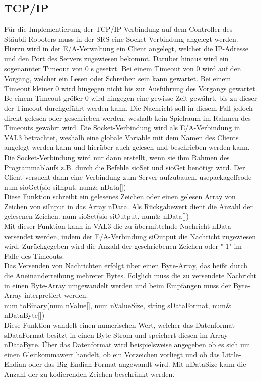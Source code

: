 \documentclass[ a4paper,
                oneside,
                toc=bibliography,
                toc=listof
                ]{scrbook}
\begin{document}
	\subsection{TCP/IP}
	Für die Implementierung der TCP/IP-Verbindung auf dem Controller des Stäubli-Roboters muss in der SRS eine Socket-Verbindung angelegt werden. Hierzu wird in der E/A-Verwaltung ein Client angelegt, welcher die IP-Adresse und den Port des Servers zugewiesen bekommt. Darüber hinaus wird ein sogenannter Timeout von 0 s gesetzt. Bei einem Timeout von 0 wird auf den Vorgang, welcher ein Lesen oder Schreiben sein kann gewartet. Bei einem Timeout kleiner 0 wird hingegen nicht bis zur Ausführung des Vorgangs gewartet. Be einem Timeout größer 0 wird hingegen eine gewisse Zeit gewährt, bis zu dieser der Timeout durchgeführt werden kann. Die Nachricht soll in diesem Fall jedoch direkt gelesen oder geschrieben werden, weshalb kein Spielraum im Rahmen des Timeouts gewährt wird. \cite{VAL3} Die Socket-Verbindung wird als E/A-Verbindung in VAL3 betrachtet, weshalb eine globale Variable mit dem Namen des Clients angelegt werden kann und hierüber auch gelesen und beschrieben werden kann. Die Socket-Verbindung wird nur dann erstellt, wenn sie ihm Rahmen des Programmablaufs z.B. durch die Befehle sioSet und sioGet benötigt wird. Der Client versucht dann eine Verbindung zum Server aufzubauen.   usepackage{ffcode}\\
	num sioGet(sio siInput, num\& nData[])\\
	Diese Funktion schreibt ein gelesenes Zeichen oder einen gelesen Array von Zeichen von siInput in das Array nData. Als Rückgabewert dient die Anzahl der gelesenen Zeichen.	
	num sioSet(sio siOutput, num\& nData[]) \\
	Mit dieser Funktion kann in VAL3 die zu übermittelnde Nachricht nData versendet werden, indem der E/A-Verbindung siOutput die Nachricht zugewiesen wird. Zurückgegeben wird die Anzahl der geschriebenen Zeichen oder "-1" im Falle des Timeouts. \\
	Das Versenden von Nachrichten erfolgt über einen Byte-Array, das heißt durch die Aneinanderreihung mehrerer Bytes. Folglich muss die zu versendete Nachricht in einen Byte-Array umgewandelt werden und beim Empfangen muss der Byte-Array interpretiert werden.\\
	num toBinary(num nValue[], num nValueSize, string sDataFormat, num\& nDataByte[])\\
	Diese Funktion wandelt einen numerischen Wert, welcher das Datenformat sDataFormat besitzt in einen Byte-Strom und speichert diesen im Array nDataByte. Über das Datenformat wird beispielsweise angegeben ob es sich um einen Gleitkommawert handelt, ob ein Vorzeichen vorliegt und ob das Little-Endian oder das Big-Endian-Format angewandt wird. Mit nDataSize kann die Anzahl der zu kodierenden Zeichen beschränkt werden.\\
\end{document}
